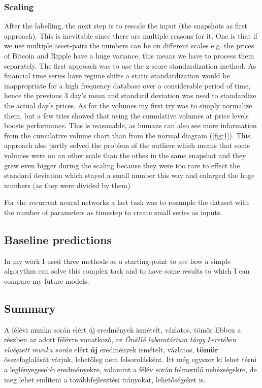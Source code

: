 \documentclass[11pt,a4paper,oneside]{article}
\begin{document}
  \subsubsection{Scaling}
  \label{scaling}

  After the labelling, the next step is to rescale the input (the snapshots as first approach). This is inevitable since 
  there are multiple reasons for it. One is that if we use multiple asset-pairs the numbers can be on different scales 
  e.g. the prices of Bitcoin and Ripple have a huge variance, this means we have to process them separately. The first 
  approach was to use the z-score standardization method. As financial time series have regime shifts a static 
  standardization would be inappropriate for a high frequency database over a considerable period of time, hence the 
  previous 3 day's mean and standard deviation was used to standardize the actual day's prices. As for the volumes my 
  first try was to simply normalize them, but a few tries showed that using the cumulative volumes at price levels 
  boosts performance. This is reasonable, as humans can also see more information from the cumulative volume chart than 
  from the normal diagram (\ref{fig:1}). This approach also partly solved the problem of the outliers which means that 
  some volumes were on an other scale than the othes in the same snapshot and they grew even bigger during the scaling 
  because they were too rare to effect the standard deviation which stayed a small number this way and enlarged the huge 
  numbers (as they were divided by them).

  For the recurrent neural networks a last task was to resample the dataset with the number of parameters as timestep to 
  create small series as inputs.

\subsection{Baseline predictions}
\label{baseline_preds}

In my work I used three methods as a starting-point to see how a simple algorythm can solve this complex task and to 
have some results to which I can compare my future models.

\subsection{Summary}
\label{sec:summary}

A félévi munka során elért új eredmények ismételt, vázlatos, tömör
Ebben a részben az adott félévre vonatkozó, az \emph{Önálló
  laboratórium tárgy keretében elvégzett munka során} elért
\textbf{új} eredmények ismételt, vázlatos, \textbf{tömör}
összefoglalását várjuk, lehetőleg nem felsorolásként.  Itt még egyszer
ki lehet térni a leglényegesebb eredményekre, valamint a félév során
felmerülő nehézségekre, de meg lehet említeni a továbbfejlesztési
irányokat, lehetőségeket is.
\end{document}
